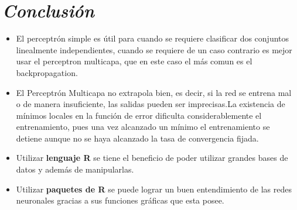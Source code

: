 \documentclass[journal]{IEEEtran}
\begin{document}
\section{\textbf{\emph{Conclusión}}}

\begin{itemize}
\item El perceptrón simple es útil para cuando se requiere clasificar dos conjuntos linealmente independientes, cuando se requiere de un caso contrario es mejor usar el perceptron multicapa, que en este caso el más comun es el backpropagation.

\item El Perceptrón Multicapa no extrapola bien, es decir, si la red se entrena mal o de manera insuficiente, las salidas pueden ser imprecisas.La existencia de mínimos locales en la función de error dificulta considerablemente el entrenamiento, pues una vez alcanzado un mínimo el entrenamiento se detiene aunque no se haya alcanzado la tasa de convergencia fijada.

\item Utilizar \textbf{lenguaje R} se tiene el beneficio de poder utilizar grandes bases de datos y además de manipularlas.
        
\item Utilizar \textbf{paquetes de R} se puede lograr un buen entendimiento de las redes neuronales gracias a sus funciones gráficas que esta posee.
\end{itemize}
\end{document}
